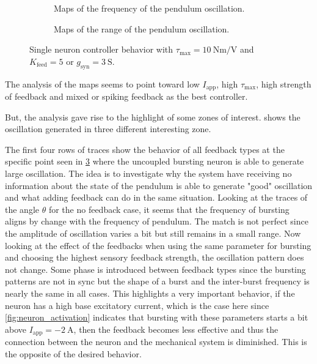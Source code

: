 \begin{figure}[!htbp]
    \centering
    \begin{subfigure}[t][.46\textheight][b]{\textwidth}
        \centering
        \caption{Maps of the frequency of the pendulum oscillation.}
        \label{fig:single_t10_high_freq}
    \end{subfigure}
    
    \begin{subfigure}[b][.46\textheight][t]{\textwidth}
        \centering
        \caption{Maps of the range of the pendulum oscillation.}
        \label{fig:single_t10_high_range}
    \end{subfigure}
    \caption{Single neuron controller behavior with $\tau_\text{max}=\qty{10}{\newton\meter\per\volt}$ and $K_\text{feed} = 5$ or $g_{\text{syn}} = \qty{3}{\siemens}$.}
    \label{fig:single_t10_high}
\end{figure}

The analysis of the maps seems to point toward low $I_\text{app}$, high $\tau_\text{max}$, high strength of feedback and mixed or spiking feedback as the best controller.

But, the analysis gave rise to the highlight of some zones of interest.
 shows the oscillation generated in three different interesting zone. 

The first four rows of traces show the behavior of all feedback types at the specific point seen in \cref{fig:single_t10_high} where the uncoupled bursting neuron is able to generate large oscillation. 
The idea is to investigate why the system have receiving no information about the state of the pendulum is able to generate "good" oscillation and what adding feedback can do in the same situation. 
Looking at the traces of the angle $\theta$ for the no feedback case, it seems that the frequency of bursting aligns by change with the frequency of pendulum. 
The match is not perfect since the amplitude of oscillation varies a bit but still remains in a small range. 
Now looking at the effect of the feedbacks when using the same parameter for bursting and choosing the highest sensory feedback strength, the oscillation pattern does not change. 
Some phase is introduced between feedback types since the bursting patterns are not in sync but the shape of a burst and the inter-burst frequency is nearly the same in all cases. 
This highlights a very important behavior, if the neuron has a high base excitatory current, which is the case here since \cref{fig:neuron_activation} indicates that bursting with these parameters starts a bit above $I_\text{app} = \qty{-2}{\ampere}$, then the feedback becomes less effective and thus the connection between the neuron and the mechanical system is diminished. 
This is the opposite of the desired behavior.

